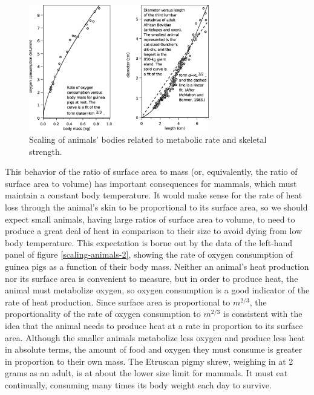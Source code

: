 \begin{figure}
\begin{center}
\includegraphics[width=0.7\textwidth]{./scaling/figs/scaling-animals-2}
\caption{ \qquad Scaling of animals' bodies related to metabolic rate and skeletal strength.}
\end{center}
\end{figure}


This behavior of the ratio of surface area to mass (or,
equivalently, the ratio of surface area to volume) has
important consequences for mammals, which must maintain a
constant body temperature. It would make sense for the rate
of heat loss through the animal's skin to be proportional to
its surface area, so we should expect small animals, having
large ratios of surface area to volume, to need to produce a
great deal of heat in comparison to their size to avoid
dying from low body temperature. This expectation is borne
out by the data of the left-hand panel of
figure \ref{scaling-animals-2}, showing the rate of
oxygen consumption of guinea pigs as a function of their
body mass. Neither an animal's heat production nor its
surface area is convenient to measure, but in order to
produce heat, the animal must metabolize oxygen, so oxygen
consumption is a good indicator of the rate of heat
production. Since surface area is proportional to $m^{2/3}$, the
proportionality of the rate of oxygen consumption to $m^{2/3}$ is
consistent with the idea that the animal needs to produce
heat at a rate in proportion to its surface area. Although
the smaller animals metabolize less oxygen and produce less
heat in absolute terms, the amount of food and oxygen they
must consume is greater in proportion to their own mass. The
Etruscan pigmy shrew, weighing in at 2 grams as an adult, is
at about the lower size limit for mammals. It must eat
continually, consuming many times its body weight each day to survive.


